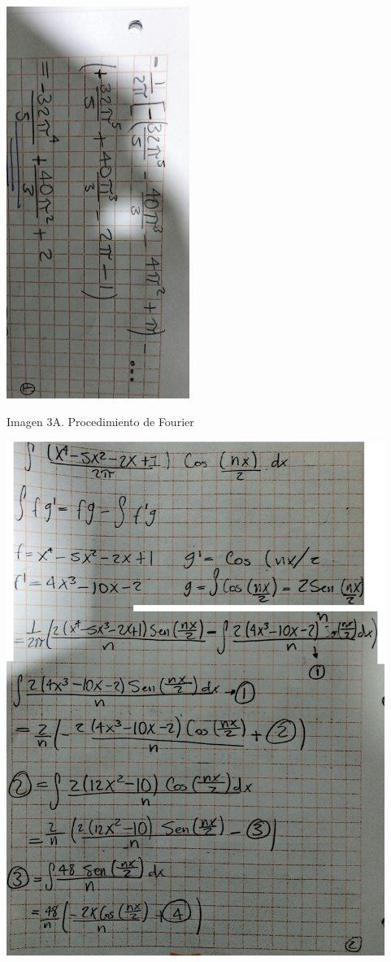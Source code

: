 \includegraphics[width=2.34606in,height=5.02604in]{media/image54.png}

Imagen 3A. Procedimiento de Fourier

\includegraphics[width=4.84817in,height=6.58854in]{media/image48.png}

